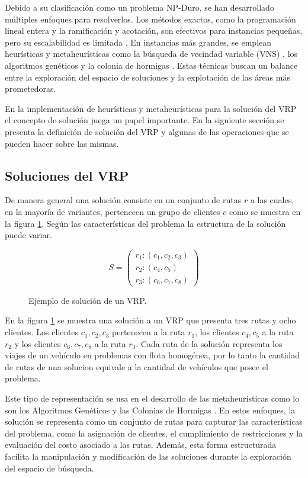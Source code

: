 \documentclass[12pt]{report}
\begin{document}
	Debido a su clasificación como un problema NP-Duro, se han desarrollado múltiples enfoques para resolverlos. Los métodos exactos, como la programación lineal entera y la ramificación y acotación, son efectivos para instancias pequeñas, pero su escalabilidad es limitada \cite{ref7}. En instancias más grandes, se emplean heurísticas y metaheurísticas como la búsqueda de vecindad variable (VNS) \cite{ref15}, los algoritmos genéticos \cite{ref9} y la colonia de hormigas \cite{ref28}. Estas técnicas buscan un balance entre la exploración del espacio de soluciones y la explotación de las áreas más prometedoras.

	En la implementación de heurísticas y metaheurísticas para la solución del VRP el concepto de solución juega un papel importante. En la siguiente sección se presenta la definición de solución del VRP y algunas de las operaciones que se pueden hacer sobre las mismas.

	\subsection{Soluciones del VRP}
	\label{sec:Soluciones del VRP}
	De manera general una solución consiste en un conjunto de rutas $r$ a las cuales, en la mayoría de variantes, pertenecen un grupo de clientes $c$ como se muestra en la figura \ref{fig:solution}. Según las características del problema la estructura de la solución puede variar.

	\begin{figure} [h]
		\centering
		\[
		S =
		\left(
		\begin{array}{l}
			r_1 : (c_1, c_2, c_3) \\
			r_2 : (c_4, c_5) \\
			r_3 : (c_6, c_7, c_8)
		\end{array}
		\right)
		\]
		\caption{Ejemplo de solución de un VRP.}
		\label{fig:solution}
	\end{figure}

	En la figura \ref{fig:solution} se muestra una solución a un VRP que presenta tres rutas y ocho clientes. Los clientes $c_1,c_2,c_3$ pertenecen a la ruta $r_1$, los clientes $c_4,c_5$ a la ruta $r_2$ y los clientes $c_6,c_7,c_8$ a la ruta $r_3$. Cada ruta de la solución representa los viajes de un vehículo en problemas con flota homogénea, por lo tanto la cantidad de rutas de una solucion equivale a la cantidad de vehículos que posee el problema.

	Este tipo de representación se usa en el desarrollo de las metaheurísticas como lo son los Algoritmos Genéticos \cite{ref13,ref8,ref9} y las Colonias de Hormigas \cite{ref28}. En estos enfoques, la solución se representa como un conjunto de rutas para capturar las características del problema, como la asignación de clientes, el cumplimiento de restricciones y la evaluación del costo asociado a las rutas. Además, esta forma estructurada facilita la manipulación y modificación de las soluciones durante la exploración del espacio de búsqueda.
\end{document}
